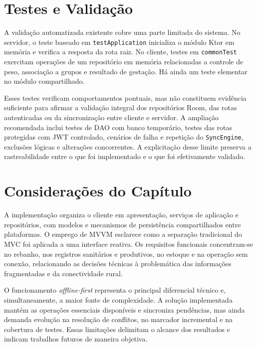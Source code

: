 \section{Testes e Validação}
\label{sec:desenvolvimento-testes}

A validação automatizada existente cobre uma parte limitada do sistema. No servidor, o teste baseado em \texttt{testApplication} inicializa o módulo Ktor em memória e verifica a resposta da rota raiz. No cliente, testes em \texttt{commonTest} exercitam operações de um repositório em memória relacionadas a controle de peso, associação a grupos e resultado de gestação. Há ainda um teste elementar no módulo compartilhado.

Esses testes verificam comportamentos pontuais, mas não constituem evidência suficiente para afirmar a validação integral dos repositórios Room, das rotas autenticadas ou da sincronização entre cliente e servidor. A ampliação recomendada inclui testes de DAO com banco temporário, testes das rotas protegidas com JWT controlado, cenários de falha e repetição do \texttt{SyncEngine}, exclusões lógicas e alterações concorrentes. A explicitação desse limite preserva a rastreabilidade entre o que foi implementado e o que foi efetivamente validado.

\section{Considerações do Capítulo}
\label{sec:desenvolvimento-consideracoes}

A implementação organiza o cliente em apresentação, serviços de aplicação e repositórios, com modelos e mecanismos de persistência compartilhados entre plataformas. O emprego de MVVM esclarece como a separação tradicional do MVC foi aplicada a uma interface reativa. Os requisitos funcionais concentram-se no rebanho, nos registros sanitários e produtivos, no estoque e na operação sem conexão, relacionando as decisões técnicas à problemática das informações fragmentadas e da conectividade rural.

O funcionamento \textit{offline-first} representa o principal diferencial técnico e, simultaneamente, a maior fonte de complexidade. A solução implementada mantém as operações essenciais disponíveis e sincroniza pendências, mas ainda demanda evolução na resolução de conflitos, no marcador incremental e na cobertura de testes. Essas limitações delimitam o alcance dos resultados e indicam trabalhos futuros de maneira objetiva.
